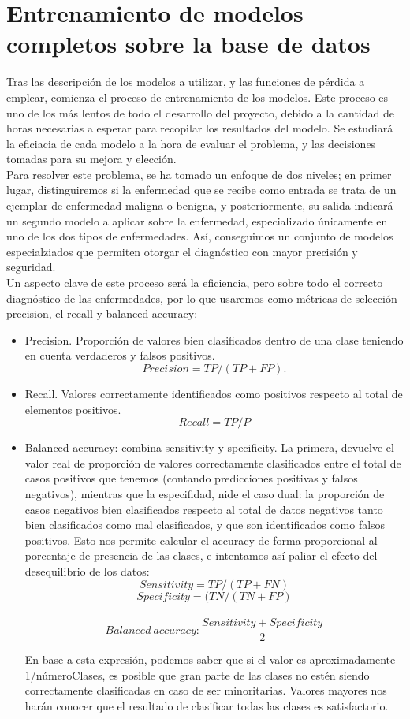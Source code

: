 \chapter{Entrenamiento de modelos completos sobre la base de datos}

Tras las descripción de los modelos a utilizar, y las funciones de pérdida a emplear, comienza el proceso de entrenamiento de los modelos. Este proceso es uno de los más lentos de todo el desarrollo del proyecto, debido a la cantidad de horas necesarias a esperar para recopilar los resultados del modelo. Se estudiará la eficiacia de cada modelo a la hora de evaluar el problema, y las decisiones tomadas para su mejora y elección.\\

Para resolver este problema, se ha tomado un enfoque de dos niveles; en primer lugar, distinguiremos si la enfermedad que se recibe como entrada se trata de un ejemplar de enfermedad maligna o benigna, y posteriormente, su salida indicará un segundo modelo a aplicar sobre la enfermedad, especializado únicamente en uno de los dos tipos de enfermedades. Así, conseguimos un conjunto de modelos especialziados que permiten otorgar el diagnóstico con mayor precisión y seguridad.\\

Un aspecto clave de este proceso será la eficiencia, pero sobre todo el correcto diagnóstico de las enfermedades, por lo que usaremos como métricas de selección precision, el recall y balanced accuracy:

\begin{itemize}
	\item Precision. Proporción de valores bien clasificados dentro de una clase teniendo en cuenta verdaderos y falsos positivos. $$Precision=TP / (TP + FP).$$
	\item Recall. Valores correctamente identificados como positivos respecto al total de elementos positivos. $$Recall = TP / P$$
	\item Balanced accuracy: combina sensitivity y specificity. La primera, devuelve el valor real de proporción de valores correctamente clasificados entre el total de casos positivos que tenemos (contando predicciones positivas y falsos negativos), mientras que la especifidad, nide el caso dual: la proporción de casos negativos bien clasificados respecto al total de datos negativos tanto bien clasificados como mal clasificados, y que son identificados como falsos positivos. Esto nos permite calcular el accuracy de forma proporcional al porcentaje de presencia de las clases, e intentamos así paliar el efecto del desequilibrio de los datos:
	$$Sensitivity = TP/(TP+FN)$$
	$$Specificity =(TN/(TN+FP)$$\\
$$ Balanced\ accuracy: \frac{Sensitivity + Specificity}{2}$$
	
	En base a esta expresión, podemos saber que si el valor es aproximadamente 1/númeroClases, es posible que gran parte de las clases no estén siendo correctamente clasificadas en caso de ser minoritarias. Valores mayores nos harán conocer que el resultado de clasificar todas las clases es satisfactorio.
\end{itemize}

